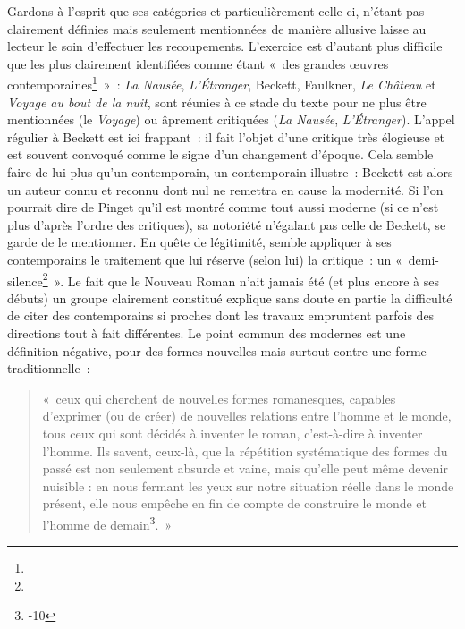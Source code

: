 Gardons à l'esprit que ses catégories et particulièrement celle-ci, n'étant pas clairement définies mais seulement mentionnées de manière allusive laisse au lecteur le soin d'effectuer les recoupements. L'exercice est d'autant plus difficile que les plus clairement identifiées comme étant «~des grandes œuvres contemporaines\footnote{}~»~: \textit{La Nausée}, \textit{L'Étranger}, Beckett, Faulkner, \textit{Le Château} et \textit{Voyage au bout de la nuit}, sont réunies à ce stade du texte pour ne plus être mentionnées (le \textit{Voyage}) ou âprement critiquées (\textit{La Nausée}, \textit{L'Étranger}). L'appel régulier à Beckett est ici frappant~: il fait l'objet d'une critique très élogieuse et est souvent convoqué comme le signe d'un changement d'époque. Cela semble faire de lui plus qu'un contemporain, un contemporain illustre~: Beckett est alors un auteur connu et reconnu dont nul ne remettra en cause la modernité. Si l'on pourrait dire de Pinget qu'il est montré comme tout aussi moderne (si ce n'est plus d'après l'ordre des critiques), sa notoriété n'égalant pas celle de Beckett, \robbe{} se garde de le mentionner. En quête de légitimité, \robbe{} semble appliquer à ses contemporains le traitement que lui réserve (selon lui) la critique~: un «~demi-silence\footnote{}~». Le fait que le Nouveau Roman n'ait jamais été (et plus encore à ses débuts) un groupe clairement constitué explique sans doute en partie la difficulté de citer des contemporains si proches dont les travaux empruntent parfois des directions tout à fait différentes. Le point commun des modernes est une définition négative, pour des formes nouvelles mais surtout contre une forme traditionnelle~:
\begin{quote}
«~ceux qui cherchent de nouvelles formes romanesques, capables d’exprimer (ou de créer) de nouvelles relations entre l’homme et le monde, tous ceux qui sont décidés à inventer le roman, c’est-à-dire à inventer l’homme. Ils savent, ceux-là, que la répétition systématique des formes du passé est non seulement absurde et vaine, mais qu’elle peut même devenir nuisible : en nous fermant les yeux sur notre situation réelle dans le monde présent, elle nous empêche en fin de compte de construire le monde et l’homme de demain\footnote{-10}.~»    
\end{quote}

